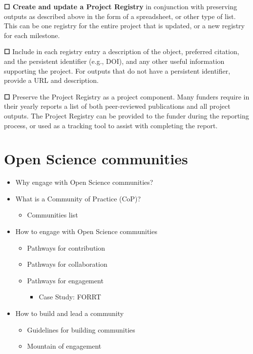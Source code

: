 \documentclass[
  letterpaper,
  DIV=11,
  numbers=noendperiod]{scrreport}
\providecommand{\tightlist}{%
  \setlength{\itemsep}{0pt}\setlength{\parskip}{0pt}}\usepackage{longtable,booktabs,array}
\begin{document}
\textbf{☐ Create and update a Project Registry }in conjunction with
preserving outputs as described above in the form of a spreadsheet, or
other type of list. This can be one registry for the entire project that
is updated, or a new registry for each milestone.

\textbf{☐ }Include in each registry entry a description of the object,
preferred citation, and the persistent identifier (e.g., DOI), and any
other useful information supporting the project. For outputs that do not
have a persistent identifier, provide a URL and description.

\textbf{☐ }Preserve the Project Registry as a project component. Many
funders require in their yearly reports a list of both peer-reviewed
publications and all project outputs. The Project Registry can be
provided to the funder during the reporting process, or used as a
tracking tool to assist with completing the report.

\hypertarget{open-science-communities}{%
\chapter{Open Science communities}\label{open-science-communities}}

\begin{itemize}
\tightlist
\item
  Why engage with Open Science communities?
\item
  What is a Community of Practice (CoP)?

  \begin{itemize}
  \tightlist
  \item
    Communities list
  \end{itemize}
\item
  How to engage with Open Science communities

  \begin{itemize}
  \tightlist
  \item
    Pathways for contribution
  \item
    Pathways for collaboration
  \item
    Pathways for engagement

    \begin{itemize}
    \tightlist
    \item
      Case Study: FORRT
    \end{itemize}
  \end{itemize}
\item
  How to build and lead a community

  \begin{itemize}
  \tightlist
  \item
    Guidelines for building communities
  \item
    Mountain of engagement
  \end{itemize}
\end{itemize}
\end{document}
